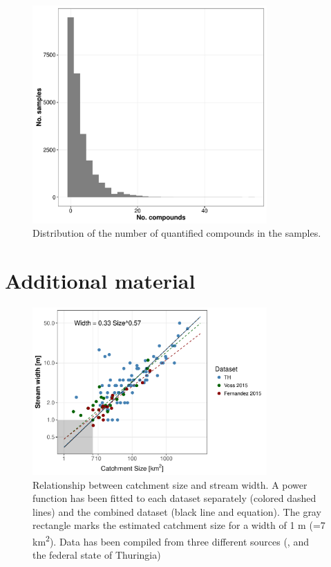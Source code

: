 \documentclass[pdftex,
	a4paper,
	titlepage=false]{scrreprt}
\begin{document}
\begin{figure}[ht]
	\centering
	\includegraphics[width = 0.8\textwidth]{pmix}
	\caption{Distribution of the number of quantified compounds in the samples.}
	\label{fig:pmix}
\end{figure}


\chapter{Additional material}

\begin{figure}[ht]
	\centering
	\includegraphics[width = 0.8\textwidth]{width_size}
	\caption[Relationship between catchment size and stream width.]{Relationship between catchment size and stream width. A power function has been fitted to each dataset separately (colored dashed lines) and the combined dataset (black line and equation). The gray rectangle marks the estimated catchment size for a width of 1 m (=7 km\textsuperscript{2}). Data has been compiled from three different sources (\citet{Fern2015}, \citet{Voss2015} and the federal state of Thuringia)}
	\label{fig:size_width}
\end{figure}



\end{document}
